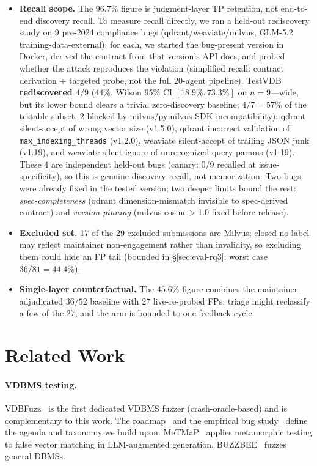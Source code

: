 \documentclass[sigconf]{acmart}
\begin{document}
\begin{itemize}[leftmargin=*,itemsep=2pt]
\item \textbf{Recall scope.} The $96.7\%$ figure is judgment-layer TP retention, not end-to-end discovery recall. To measure recall directly, we ran a held-out rediscovery study on 9 pre-2024 compliance bugs (qdrant/weaviate/milvus, GLM-5.2 training-data-external): for each, we started the bug-present version in Docker, derived the contract from that version's API docs, and probed whether the attack reproduces the violation (simplified recall: contract derivation + targeted probe, not the full 20-agent pipeline). TestVDB \textbf{rediscovered $4/9$} ($44\%$, Wilson 95\% CI $[18.9\%, 73.3\%]$ on $n{=}9$---wide, but its lower bound clears a trivial zero-discovery baseline; $4/7{=}57\%$ of the testable subset, $2$ blocked by milvus/pymilvus SDK incompatibility): qdrant silent-accept of wrong vector size (v1.5.0), qdrant incorrect validation of \texttt{max\_indexing\_threads} (v1.2.0), weaviate silent-accept of trailing JSON junk (v1.19), and weaviate silent-ignore of unrecognized query params (v1.19). These $4$ are independent held-out bugs (canary: 0/9 recalled at issue-specificity), so this is genuine discovery recall, not memorization. Two bugs were already fixed in the tested version; two deeper limits bound the rest: \emph{spec-completeness} (qdrant dimension-mismatch invisible to spec-derived contract) and \emph{version-pinning} (milvus cosine$>$1.0 fixed before release).
\item \textbf{Excluded set.} 17 of the 29 excluded submissions are Milvus; closed-no-label may reflect maintainer non-engagement rather than invalidity, so excluding them could hide an FP tail (bounded in \S\ref{sec:eval-rq3}: worst case $36/81{=}44.4\%$).
\item \textbf{Single-layer counterfactual.} The $45.6\%$ figure combines the maintainer-adjudicated $36/52$ baseline with 27 live-re-probed FPs; triage might reclassify a few of the 27, and the arm is bounded to one feedback cycle.
\end{itemize}

\section{Related Work}\label{sec:rw}
\paragraph{VDBMS testing.} VDBFuzz~\cite{vdbfuzz26} is the first dedicated VDBMS fuzzer (crash-oracle-based) and is complementary to this work. The roadmap~\cite{roadmap25} and the empirical bug study~\cite{bugstudy25} define the agenda and taxonomy we build upon. MeTMaP~\cite{metmap24} applies metamorphic testing to false vector matching in LLM-augmented generation. BUZZBEE~\cite{buzzbee24} fuzzes general DBMSs.
\end{document}
